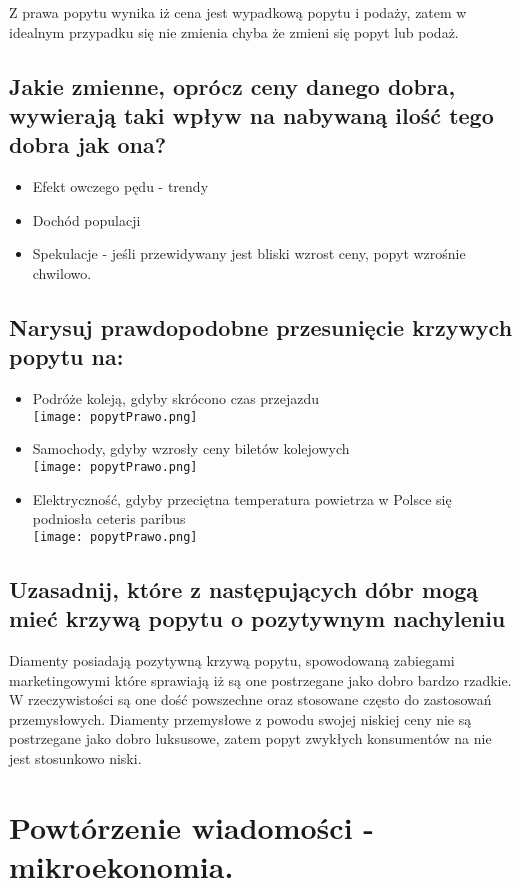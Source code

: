 \documentclass[a4paper,12pt]{article}
\newcommand{\popytPrawo}{\\\texttt{[image: popytPrawo.png]}}
\begin{document}
Z prawa popytu wynika iż cena jest wypadkową popytu i podaży, zatem w idealnym przypadku się nie zmienia chyba że zmieni się popyt lub podaż.

\subsection{Jakie zmienne, oprócz ceny danego dobra, wywierają taki wpływ na nabywaną ilość tego dobra jak ona?}

\begin{itemize}
	\item Efekt owczego pędu - trendy
	\item Dochód populacji
	\item Spekulacje - jeśli przewidywany jest bliski wzrost ceny, popyt wzrośnie chwilowo.
\end{itemize}

\subsection{Narysuj prawdopodobne przesunięcie krzywych popytu na:}

\begin{itemize}
	\item Podróże koleją, gdyby skrócono czas przejazdu \popytPrawo
	\item Samochody, gdyby wzrosły ceny biletów kolejowych \popytPrawo
	\item Elektryczność, gdyby przeciętna temperatura powietrza w Polsce się podniosła ceteris paribus \popytPrawo
\end{itemize}

\subsection{Uzasadnij, które z następujących dóbr mogą mieć krzywą popytu o pozytywnym nachyleniu}

Diamenty posiadają pozytywną krzywą popytu, spowodowaną zabiegami marketingowymi które sprawiają iż są one postrzegane jako dobro bardzo rzadkie. W rzeczywistości są one dość powszechne oraz stosowane często do zastosowań przemysłowych. Diamenty przemysłowe z powodu swojej niskiej ceny nie są postrzegane jako dobro luksusowe, zatem popyt zwykłych konsumentów na nie jest stosunkowo niski.

\section{Powtórzenie wiadomości - mikroekonomia.}
\end{document}
